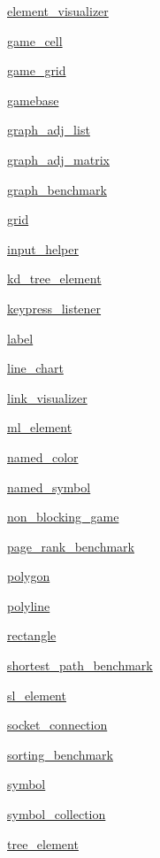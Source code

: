 \begin{DoxyCompactItemize}
 \hyperlink{namespacebridges_1_1element__visualizer}{element\+\_\+visualizer}
\item 
 \hyperlink{namespacebridges_1_1game__cell}{game\+\_\+cell}
\item 
 \hyperlink{namespacebridges_1_1game__grid}{game\+\_\+grid}
\item 
 \hyperlink{namespacebridges_1_1gamebase}{gamebase}
\item 
 \hyperlink{namespacebridges_1_1graph__adj__list}{graph\+\_\+adj\+\_\+list}
\item 
 \hyperlink{namespacebridges_1_1graph__adj__matrix}{graph\+\_\+adj\+\_\+matrix}
\item 
 \hyperlink{namespacebridges_1_1graph__benchmark}{graph\+\_\+benchmark}
\item 
 \hyperlink{namespacebridges_1_1grid}{grid}
\item 
 \hyperlink{namespacebridges_1_1input__helper}{input\+\_\+helper}
\item 
 \hyperlink{namespacebridges_1_1kd__tree__element}{kd\+\_\+tree\+\_\+element}
\item 
 \hyperlink{namespacebridges_1_1keypress__listener}{keypress\+\_\+listener}
\item 
 \hyperlink{namespacebridges_1_1label}{label}
\item 
 \hyperlink{namespacebridges_1_1line__chart}{line\+\_\+chart}
\item 
 \hyperlink{namespacebridges_1_1link__visualizer}{link\+\_\+visualizer}
\item 
 \hyperlink{namespacebridges_1_1ml__element}{ml\+\_\+element}
\item 
 \hyperlink{namespacebridges_1_1named__color}{named\+\_\+color}
\item 
 \hyperlink{namespacebridges_1_1named__symbol}{named\+\_\+symbol}
\item 
 \hyperlink{namespacebridges_1_1non__blocking__game}{non\+\_\+blocking\+\_\+game}
\item 
 \hyperlink{namespacebridges_1_1page__rank__benchmark}{page\+\_\+rank\+\_\+benchmark}
\item 
 \hyperlink{namespacebridges_1_1polygon}{polygon}
\item 
 \hyperlink{namespacebridges_1_1polyline}{polyline}
\item 
 \hyperlink{namespacebridges_1_1rectangle}{rectangle}
\item 
 \hyperlink{namespacebridges_1_1shortest__path__benchmark}{shortest\+\_\+path\+\_\+benchmark}
\item 
 \hyperlink{namespacebridges_1_1sl__element}{sl\+\_\+element}
\item 
 \hyperlink{namespacebridges_1_1socket__connection}{socket\+\_\+connection}
\item 
 \hyperlink{namespacebridges_1_1sorting__benchmark}{sorting\+\_\+benchmark}
\item 
 \hyperlink{namespacebridges_1_1symbol}{symbol}
\item 
 \hyperlink{namespacebridges_1_1symbol__collection}{symbol\+\_\+collection}
\item 
 \hyperlink{namespacebridges_1_1tree__element}{tree\+\_\+element}
\end{DoxyCompactItemize}

